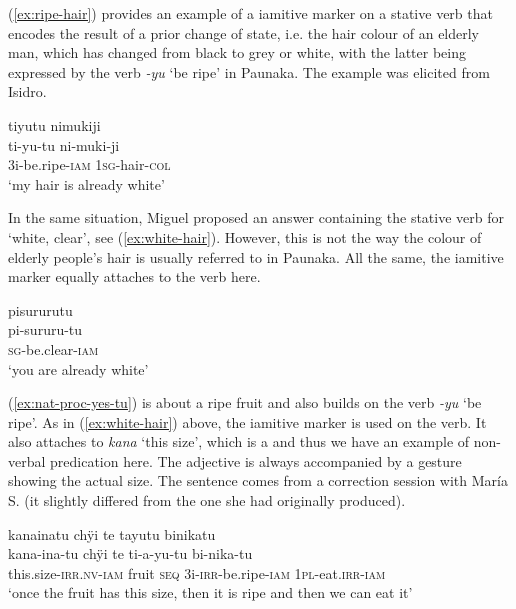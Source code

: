 (\ref{ex:ripe-hair}) provides an example of a iamitive marker on a stative verb that encodes the result of a prior change of state, i.e. the hair colour of an elderly man, which has changed from black to grey or white, with the latter being expressed by the verb \textit{-yu} ‘be ripe’ in Paunaka. The example was elicited from Isidro.

\ea\label{ex:ripe-hair}
\begingl 
\glpreamble tiyutu nimukiji\\
\gla ti-yu-tu ni-muki-ji\\ 
\glb 3i-be.ripe-\textsc{iam} 1\textsc{sg}-hair-\textsc{col}\\ 
\glft ‘my hair is already white’
\trailingcitation{[mdx-c120416ls.150]}%
\xe

In the same situation, Miguel proposed an answer containing the stative verb for ‘white, clear’, see (\ref{ex:white-hair}). However, this is not the way the colour of elderly people’s hair is usually referred to in Paunaka. All the same, the iamitive marker equally attaches to the verb here.

\ea\label{ex:white-hair}
\begingl
\glpreamble pisururutu\\
\gla pi-sururu-tu\\
\textsc{sg}-be.clear-\textsc{iam}\\
\glft ‘you are already white’
\endgl
\trailingcitation{[mdx-c120416ls.143]}
\xe


(\ref{ex:nat-proc-yes-tu}) is about a ripe fruit and also builds on the verb \textit{-yu} ‘be ripe’. As in (\ref{ex:white-hair}) above, the iamitive marker is used on the verb. It also attaches to \textit{kana} ‘this size’, which is a  and thus we have an example of non-verbal predication here. The adjective is always accompanied by a gesture showing the actual size. The sentence comes from a correction session with María S. (it slightly differed from the one she had originally produced).

\ea\label{ex:nat-proc-yes-tu}
\begingl
\glpreamble kanainatu chÿi te tayutu binikatu\\
\gla kana-ina-tu chÿi te ti-a-yu-tu bi-nika-tu\\
\glb this.size-\textsc{irr.nv}-\textsc{iam} fruit \textsc{seq} 3i-\textsc{irr}-be.ripe-\textsc{iam} 1\textsc{pl}-eat.\textsc{irr}-\textsc{iam}\\
\glft ‘once the fruit has this size, then it is ripe and then we can eat it’
\endgl
\trailingcitation{[rxx-e121128s-3.11]}
\xe

